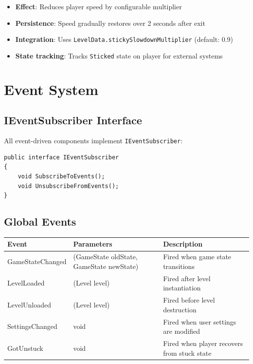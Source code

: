 \documentclass{report}
\begin{document}
\begin{itemize}[noitemsep]
	\item \textbf{Effect}: Reduces player speed by configurable multiplier
	\item \textbf{Persistence}: Speed gradually restores over 2 seconds after exit
	\item \textbf{Integration}: Uses \texttt{LevelData.stickySlowdownMultiplier} (default: 0.9)
	\item \textbf{State tracking}: Tracks \texttt{Sticked} state on player for external systems
\end{itemize}

\chapter{Event System}
\section{IEventSubscriber Interface}
All event-driven components implement \texttt{IEventSubscriber}:

\begin{verbatim}
public interface IEventSubscriber
{
    void SubscribeToEvents();
    void UnsubscribeFromEvents();
}
\end{verbatim}

\section{Global Events}
\begin{longtable}{|l|l|p{6cm}|}
	\hline
	\textbf{Event}   & \textbf{Parameters}                      & \textbf{Description}                        \\
	\hline
	GameStateChanged & (GameState oldState, GameState newState) & Fired when game state transitions           \\
	\hline
	LevelLoaded      & (Level level)                            & Fired after level instantiation             \\
	\hline
	LevelUnloaded    & (Level level)                            & Fired before level destruction              \\
	\hline
	SettingsChanged  & void                                     & Fired when user settings are modified       \\
	\hline
	GotUnstuck       & void                                     & Fired when player recovers from stuck state \\
	\hline
\end{longtable}
\end{document}
